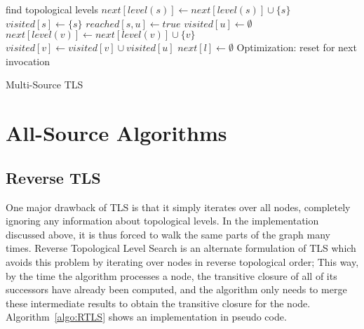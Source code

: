 \documentclass[12pt,a4paper,twoside]{article}
\DeclareMathOperator*{\argmin}{\arg\!\min}
\begin{document}
\begin{algorithm}
  \begin{algorithmic}
      \State find topological levels
        \State $next[level(s)] \gets next[level(s)] \cup \{s\}$
        \State $visited[s] \gets \{s\}$
      \EndFor
      \For{$l \gets \argmin_{s \in S} level(s), maxLevel$}
            \State $reached[s, u] \gets true$
          \EndFor
          \State $visited[u] \gets \emptyset$
              \State $next[level(v)] \gets next[level(v)] \cup \{v\}$
            \EndIf
            \State $visited[v] \gets visited[v] \cup visited[u]$
          \EndFor
        \EndFor
        \State $next[l] \gets \emptyset$ \Comment Optimization: reset for next invocation
      \EndFor
    \EndFunction
  \end{algorithmic}
  \caption{Multi-Source TLS}
  \label{algo:MultiTLS}
\end{algorithm}

\section{All-Source Algorithms}

\subsection{Reverse TLS}

One major drawback of TLS is that it simply iterates over all nodes, completely ignoring any information about topological levels. In the implementation discussed above, it is thus forced to walk the same parts of the graph many times. Reverse Topological Level Search is an alternate formulation of TLS which avoids this problem by iterating over nodes in reverse topological order; This way, by the time the algorithm processes a node, the transitive closure of all of its successors have already been computed, and the algorithm only needs to merge these intermediate results to obtain the transitive closure for the node. Algorithm~\ref{algo:RTLS} shows an implementation in pseudo code.
\end{document}
